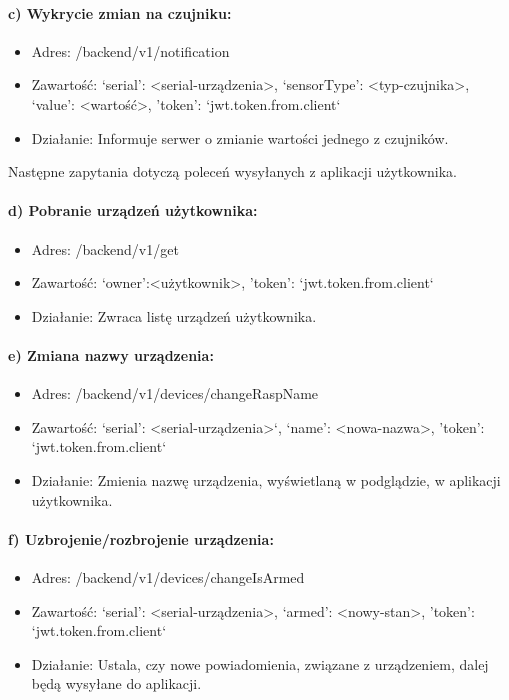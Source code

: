 \paragraph{c) Wykrycie zmian na czujniku:}
\begin{itemize}
\item Adres: /backend/v1/notification
\item Zawartość: {‘serial’: <serial-urządzenia>, ‘sensorType’: <typ-czujnika>, ‘value’: <wartość>, 'token': `jwt.token.from.client`}
\item Działanie: Informuje serwer o zmianie wartości jednego z czujników.
\end{itemize}
Następne zapytania dotyczą poleceń wysyłanych z aplikacji użytkownika.
\paragraph{d) Pobranie urządzeń użytkownika:}
\begin{itemize}
\item Adres: /backend/v1/get
\item Zawartość: {‘owner’:<użytkownik>, 'token': `jwt.token.from.client`}
\item Działanie: Zwraca listę urządzeń użytkownika.
\end{itemize}
\paragraph{e) Zmiana nazwy urządzenia:}
\begin{itemize}
\item Adres: /backend/v1/devices/changeRaspName
\item Zawartość: {‘serial’: <serial-urządzenia>‘, ‘name’: <nowa-nazwa>, 'token': `jwt.token.from.client`}
\item Działanie: Zmienia nazwę urządzenia, wyświetlaną w podglądzie, w aplikacji użytkownika.
\end{itemize}
\paragraph{f) Uzbrojenie/rozbrojenie urządzenia:}
\begin{itemize}
\item Adres: /backend/v1/devices/changeIsArmed
\item Zawartość: {‘serial’: <serial-urządzenia>, ‘armed’: <nowy-stan>, 'token': `jwt.token.from.client`}
\item Działanie: Ustala, czy nowe powiadomienia, związane z urządzeniem, dalej będą wysyłane do aplikacji.
\end{itemize}
